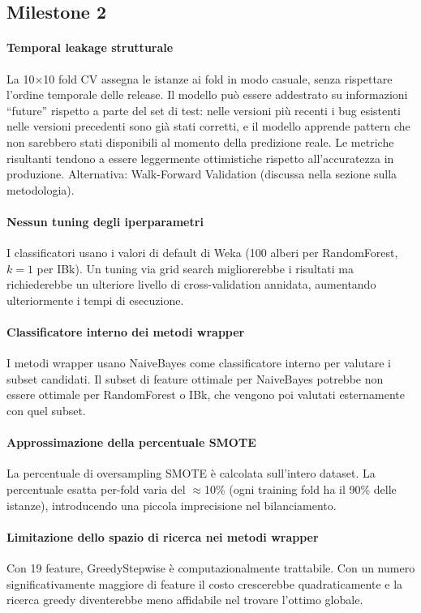 \subsection{Milestone 2}

\paragraph{Temporal leakage strutturale}
La 10$\times$10 fold CV assegna le istanze ai fold in modo casuale, senza rispettare
l'ordine temporale delle release. Il modello può essere addestrato su informazioni
``future'' rispetto a parte del set di test: nelle versioni più recenti i bug esistenti
nelle versioni precedenti sono già stati corretti, e il modello apprende pattern che non
sarebbero stati disponibili al momento della predizione reale. Le metriche risultanti
tendono a essere leggermente ottimistiche rispetto all'accuratezza in produzione.
Alternativa: Walk-Forward Validation (discussa nella sezione sulla metodologia).

\paragraph{Nessun tuning degli iperparametri}
I classificatori usano i valori di default di Weka (100 alberi per RandomForest, $k=1$
per IBk). Un tuning via grid search migliorerebbe i risultati ma richiederebbe un
ulteriore livello di cross-validation annidata, aumentando ulteriormente i tempi di
esecuzione.

\paragraph{Classificatore interno dei metodi wrapper}
I metodi wrapper usano NaiveBayes come classificatore interno per valutare i subset
candidati. Il subset di feature ottimale per NaiveBayes potrebbe non essere ottimale per
RandomForest o IBk, che vengono poi valutati esternamente con quel subset.

\paragraph{Approssimazione della percentuale SMOTE}
La percentuale di oversampling SMOTE è calcolata sull'intero dataset. La percentuale
esatta per-fold varia del $\approx$10\% (ogni training fold ha il 90\% delle istanze),
introducendo una piccola imprecisione nel bilanciamento.

\paragraph{Limitazione dello spazio di ricerca nei metodi wrapper}
Con 19 feature, GreedyStepwise è computazionalmente trattabile. Con un numero
significativamente maggiore di feature il costo crescerebbe quadraticamente e la ricerca
greedy diventerebbe meno affidabile nel trovare l'ottimo globale.

